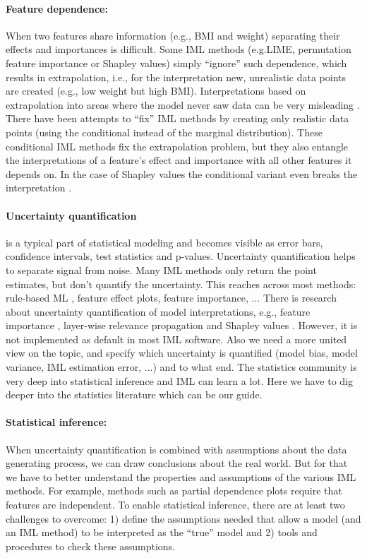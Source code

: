 \documentclass[runningheads]{llncs}
\begin{document}
\paragraph{Feature dependence:} When two features share information (e.g., BMI and weight) separating their effects and importances is difficult.
Some IML methods (e.g.LIME, permutation feature importance or Shapley values) simply \enquote{ignore} such dependence, which results in extrapolation, i.e., for the interpretation new, unrealistic data points are created (e.g., low weight but high BMI).
Interpretations based on extrapolation into areas where the model never saw data can be very misleading \cite{hooker2019please}.
There have been attempts to \enquote{fix} IML methods by creating only realistic data points (using the conditional instead of the marginal distribution).
These conditional IML methods fix the extrapolation problem, but they also entangle the interpretations of a feature's effect and importance with all other features it depends on.
In the case of Shapley values the conditional variant even breaks the interpretation \cite{sundararajan2019many,janzing2019feature}.

\paragraph{Uncertainty quantification} is a typical part of statistical modeling and becomes visible as error bars, confidence intervals, test statistics and p-values.
Uncertainty quantification helps to separate signal from noise.
Many IML methods only return the point estimates, but don't quantify the uncertainty.
This reaches across most methods: rule-based ML , feature effect plots, feature importance, ...
There is research about uncertainty quantification of model interpretations, e.g., feature importance \cite{watson2019testing,fisher2019all}, layer-wise relevance propagation \cite{fabi2020feature} and Shapley values \cite{williamson2020efficient}.
However, it is not implemented as default in most IML software.
Also we need a more united view on the topic, and specify which uncertainty is quantified (model bias, model variance, IML estimation error, ...) and to what end.
The statistics community is very deep into statistical inference and IML can learn a lot.
Here we have to dig deeper into the statistics literature which can be our guide.

\paragraph{Statistical inference:}
When uncertainty quantification is combined with assumptions about the data generating process, we can draw conclusions about the real world.
But for that we have to better understand the properties and assumptions of the various IML methods.
For example, methods such as partial dependence plots require that features are independent.
To enable statistical inference, there are at least two challenges to overcome: 1) define the assumptions needed that allow a model (and an IML method) to be interpreted as the \enquote{true} model and 2) tools and procedures to check these assumptions.
\end{document}
